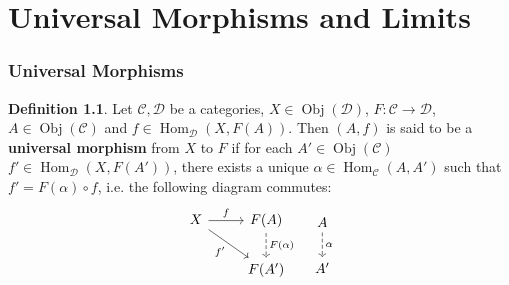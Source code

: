 \documentclass{book}
\theoremstyle{definition}
\newtheorem{defn}[definition]{Definition}
\newcommand{\al}{\alpha}
\newcommand{\MC}{\mathcal{C}}
\newcommand{\MD}{\mathcal{D}}
\DeclareMathOperator{\Obj}{Obj}
\DeclareMathOperator{\Hom}{Hom}
\DeclareMathOperator*{\0}{\mbf{0}}
\DeclareMathOperator*{\1}{\mbf{1}}
\begin{document}
	
	
	
	
	
	
	
	
	
	
	
	
	
	
	
	
	
	
	
	
	
	
	
	
	
	
	
	
	
	
	
	
	
	
	
	
	
	
	
	
	
	
	
	
	
	
	
	
	
	
	\newpage
	\chapter{Universal Morphisms and Limits}
	
	\subsection{Universal Morphisms}

	\begin{defn}
		Let $\MC, \MD$ be a categories, $X \in \Obj(\MD)$, $F: \MC \rightarrow \MD$, $A \in \Obj(\MC)$ and $f \in \Hom_{\MD}(X, F(A))$. Then $(A, f)$ is said to be a \textbf{universal morphism} from $X$ to $F$ if for each $A' \in \Obj(\MC)$ $f' \in \Hom_{\MD}(X, F(A'))$, there exists a unique $\al \in \Hom_{\MC}(A, A')$ such that $f' = F(\al) \circ f$, i.e. the following diagram commutes:
		\[
		\begin{tikzcd}
			X \arrow[r, "f"]  \arrow[dr, "f'"'] & F(A) \arrow[d, "F(\al)", dashed] \\
			                                    & F(A')  
		\end{tikzcd}
		\hspace{.3cm}
		\begin{tikzcd}
			A  \arrow[d, "\al", dashed] \\
			A'  
		\end{tikzcd}
		\]
	\end{defn}
\end{document}
